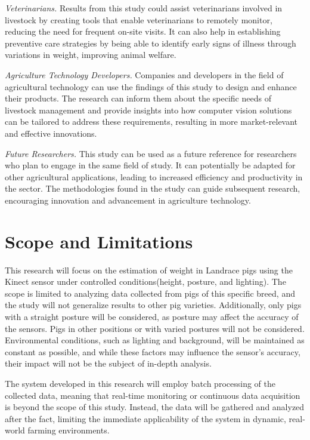 {\textit{Veterinarians.} Results from this study could assist veterinarians involved in livestock by creating tools that enable veterinarians to remotely monitor, reducing the need for frequent on-site visits. It can also help in establishing preventive care strategies by being able to identify early signs of illness through variations in weight, improving animal welfare.

\textit{Agriculture Technology Developers.} Companies and developers in the field of agricultural technology can use the findings of this study to design and enhance their products. The research can inform them about the specific needs of livestock management and provide insights into how computer vision solutions can be tailored to address these requirements, resulting in more market-relevant and effective innovations.

\textit{Future Researchers.} This study can be used as a future reference for researchers who plan to engage in the same field of study. It can potentially be adapted for other agricultural applications, leading to increased efficiency and productivity in the sector. The methodologies found in the study can guide subsequent research, encouraging innovation and advancement in agriculture technology.

\section{Scope and Limitations}

This research will focus on the estimation of weight in Landrace pigs using the Kinect sensor under controlled conditions(height, posture, and lighting). The scope is limited to analyzing data collected from pigs of this specific breed, and the study will not generalize results to other pig varieties. Additionally, only pigs with a straight posture will be considered, as posture may affect the accuracy of the sensors. Pigs in other positions or with varied postures will not be considered. Environmental conditions, such as lighting and background, will be maintained as constant as possible, and while these factors may influence the sensor's accuracy, their impact will not be the subject of in-depth analysis. 

The system developed in this research will employ batch processing of the collected data, meaning that real-time monitoring or continuous data acquisition is beyond the scope of this study. Instead, the data will be gathered and analyzed after the fact, limiting the immediate applicability of the system in dynamic, real-world farming environments.


}
